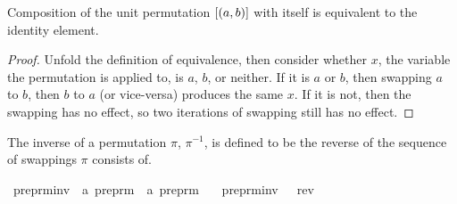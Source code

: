 \begin{lemma}
\label{lemma:unit-involution}
Composition of the unit permutation \([\left(a, b\right)]\) with itself is equivalent to the identity element.
\end{lemma}
\begin{proof}
Unfold the definition of equivalence, then consider whether \(x\), the variable the permutation is applied to, is \(a\), \(b\), or neither.
If it is \(a\) or \(b\), then swapping \(a\) to \(b\), then \(b\) to \(a\) (or vice-versa) produces the same \(x\).
If it is not, then the swapping has no effect, so two iterations of swapping still has no effect.
\end{proof}

\begin{definition}
The inverse of a permutation \(\pi\), \(\pi^{-1}\), is defined to be the reverse of the sequence of swappings \(\pi\) consists of.
\end{definition}

\begin{implementation}
\isamarkupfalse%
\ preprm{\isacharunderscore}inv\ {\isacharcolon}{\isacharcolon}\ {\isachardoublequoteopen}{\isacharprime}a\ preprm\ {\isasymRightarrow}\ {\isacharprime}a\ preprm{\isachardoublequoteclose}\ \isanewline
\ \ {\isachardoublequoteopen}preprm{\isacharunderscore}inv\ {\isasympi}\ {\isasymequiv}\ rev\ {\isasympi}{\isachardoublequoteclose}\isanewline
\end{implementation}

